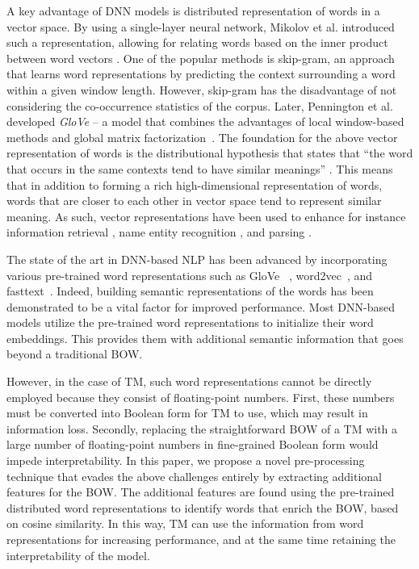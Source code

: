 \documentclass[11pt]{article}
\begin{document}
\par A key advantage of DNN models is distributed representation of words in a vector space. By using a single-layer neural network, Mikolov et al. introduced such a representation, allowing for relating words based on the inner product between word vectors \cite{Mikolov2013DistributedRO}. One of the popular methods is skip-gram, an approach that learns word representations by predicting the context surrounding a word within a given window length. However, skip-gram has the disadvantage of not considering the co-occurrence statistics of the corpus. Later, Pennington et al. developed \emph{GloVe} -- a model that combines the advantages of local window-based methods and global matrix factorization~\cite{Pennington2014GloVeGV}. The foundation for the above vector representation of words is the distributional hypothesis that states that ``the word that occurs in the same contexts tend to have similar meanings'' \cite{doi:10.1080/00437956.1954.11659520}. This means that in addition to forming a rich high-dimensional representation of words, words that are closer to each other in vector space tend to represent similar meaning. As such, vector representations have been used to enhance for instance information retrieval \cite{manning_raghavan_schutze_2008}, name entity recognition \cite{turian}, and parsing \cite{socher}. 

\par The state of the art in DNN-based NLP has been advanced by incorporating various pre-trained word representations such as GloVe~ \cite{Pennington2014GloVeGV}, word2vec~\cite{Mikolov2013DistributedRO}, and fasttext~\cite{bojanowski2017enriching}. Indeed, building semantic representations of the words has been demonstrated to be a vital factor for improved performance. Most DNN-based models utilize the pre-trained word representations to initialize their word embeddings. This provides them with additional semantic information that goes beyond  a traditional BOW.

However, in the case of TM, such word representations cannot be directly employed because they consist of floating-point numbers. First, these numbers must be converted into Boolean form for TM to use, which may result in information loss. Secondly, replacing the straightforward BOW of a TM with a large number of floating-point numbers in fine-grained Boolean form would impede interpretability. In this paper, we propose a novel pre-processing technique that evades the above challenges entirely by extracting additional features for the BOW. The additional features are found using the pre-trained distributed word representations to identify words that enrich the BOW, based on cosine similarity. In this way, TM can use the information from word representations for increasing performance, and at the same time retaining the interpretability of the model.
\end{document}
